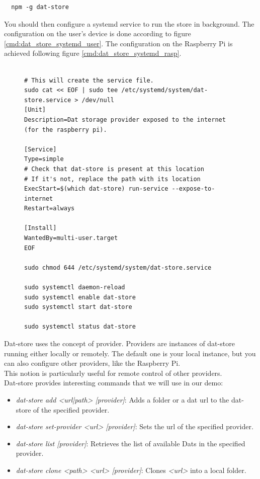 \documentclass[a4paper,11pt,oneside]{report}
\begin{document}
\begin{lstlisting}
  npm -g dat-store
\end{lstlisting}

You should then configure a systemd service to run the store in background. The configuration on the user's device is done according to figure \ref{cmd:dat_store_systemd_user}. The configuration on the Raspberry Pi is achieved following figure \ref{cmd:dat_store_systemd_rasp}.

\begin{figure}
  \begin{lstlisting}[label=cmd:dat_store_systemd_rasp, caption=Configure dat-store systemd service on the raspberry pi]
    
# This will create the service file.
sudo cat << EOF | sudo tee /etc/systemd/system/dat-store.service > /dev/null
[Unit]
Description=Dat storage provider exposed to the internet (for the raspberry pi).

[Service]
Type=simple
# Check that dat-store is present at this location
# If it's not, replace the path with its location
ExecStart=$(which dat-store) run-service --expose-to-internet
Restart=always

[Install]
WantedBy=multi-user.target
EOF

sudo chmod 644 /etc/systemd/system/dat-store.service

sudo systemctl daemon-reload
sudo systemctl enable dat-store
sudo systemctl start dat-store

sudo systemctl status dat-store
  \end{lstlisting}
\end{figure}

Dat-store uses the concept of provider. Providers are instances of dat-store running either locally or remotely. The default one is your local instance, but you can also configure other providers, like the Raspberry Pi. \\
This notion is particularly useful for remote control of other providers. \\

Dat-store provides interesting commands that we will use in our demo:
\begin{itemize}
  \item \emph{dat-store add <url|path> [provider]}: Adds a folder or a dat url to the dat-store of the specified provider.
  \item \emph{dat-store set-provider <url> [provider]}: Sets the url of the specified provider.
  \item \emph{dat-store list [provider]}: Retrieves the list of available Dats in the specified provider.
  \item \emph{dat-store clone <path> <url> [provider]}: Clones \emph{<url>} into a local folder.
\end{itemize}
\end{document}
